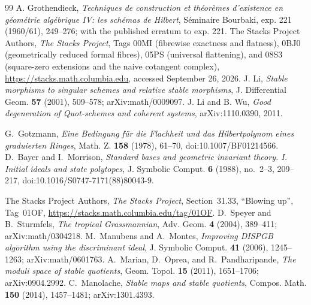 \documentclass[11pt,reqno]{amsart}
\numberwithin{equation}{section}
\theoremstyle{definition}\newtheorem{definition}[theorem]{Definition}
\theoremstyle{remark}\newtheorem{remark}[theorem]{Remark}
\begin{document}
\begin{thebibliography}{99}
A. Grothendieck, \emph{Techniques de construction et th\'eor\`emes
d'existence en g\'eom\'etrie alg\'ebrique IV: les sch\'emas de Hilbert},
S\'eminaire Bourbaki, exp. 221 (1960/61), 249--276; with the published
erratum to exp. 221.
The Stacks Project Authors, \emph{The Stacks Project},
Tags 00MI (fibrewise exactness and flatness), 0BJ0 (geometrically
reduced formal fibres), 05PS (universal flattening), and 08S3
(square-zero extensions and the naive cotangent complex),
\url{https://stacks.math.columbia.edu}, accessed September 26, 2026.
J. Li, \emph{Stable morphisms to singular schemes and relative
stable morphisms}, J. Differential Geom. \textbf{57} (2001),
509--578; arXiv:math/0009097.
J. Li and B. Wu, \emph{Good degeneration of Quot-schemes and
coherent systems}, arXiv:1110.0390, 2011.


G.~Gotzmann, \emph{Eine Bedingung f\"ur die Flachheit und das
Hilbertpolynom eines graduierten Ringes}, Math. Z. \textbf{158}
(1978), 61--70, doi:10.1007/BF01214566.
D.~Bayer and I.~Morrison, \emph{Standard bases and geometric invariant
theory. I. Initial ideals and state polytopes}, J. Symbolic Comput.
\textbf{6} (1988), no.~2--3, 209--217,
doi:10.1016/S0747-7171(88)80043-9.


The Stacks Project Authors, \emph{The Stacks Project},
Section~31.33, ``Blowing up'', Tag~01OF,
\url{https://stacks.math.columbia.edu/tag/01OF}.
D.~Speyer and B.~Sturmfels, \emph{The tropical Grassmannian},
Adv. Geom. \textbf{4} (2004), 389--411;
arXiv:math/0304218.
M.~Manubens and A.~Montes, \emph{Improving DISPGB algorithm using
the discriminant ideal}, J. Symbolic Comput. \textbf{41} (2006),
1245--1263; arXiv:math/0601763.
A.~Marian, D.~Oprea, and R.~Pandharipande,
\emph{The moduli space of stable quotients}, Geom. Topol.
\textbf{15} (2011), 1651--1706; arXiv:0904.2992.
C.~Manolache, \emph{Stable maps and stable quotients},
Compos. Math. \textbf{150} (2014), 1457--1481; arXiv:1301.4393.

\end{thebibliography}
\end{document}
